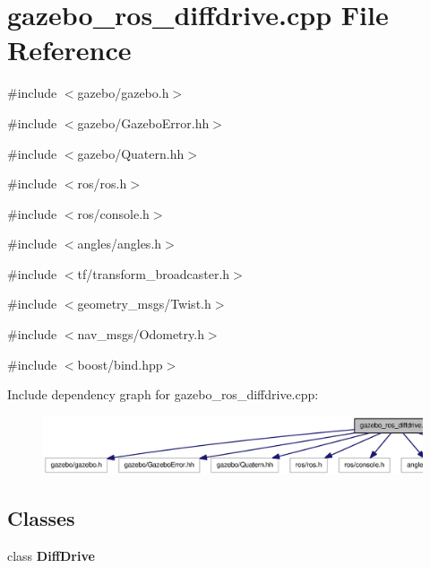 \section{gazebo\_\-ros\_\-diffdrive.cpp File Reference}
\label{gazebo__ros__diffdrive_8cpp}
{\ttfamily \#include $<$gazebo/gazebo.h$>$}\par
{\ttfamily \#include $<$gazebo/GazeboError.hh$>$}\par
{\ttfamily \#include $<$gazebo/Quatern.hh$>$}\par
{\ttfamily \#include $<$ros/ros.h$>$}\par
{\ttfamily \#include $<$ros/console.h$>$}\par
{\ttfamily \#include $<$angles/angles.h$>$}\par
{\ttfamily \#include $<$tf/transform\_\-broadcaster.h$>$}\par
{\ttfamily \#include $<$geometry\_\-msgs/Twist.h$>$}\par
{\ttfamily \#include $<$nav\_\-msgs/Odometry.h$>$}\par
{\ttfamily \#include $<$boost/bind.hpp$>$}\par
Include dependency graph for gazebo\_\-ros\_\-diffdrive.cpp:
\nopagebreak
\begin{figure}[H]
\begin{center}
\leavevmode
\includegraphics[width=400pt]{gazebo__ros__diffdrive_8cpp__incl}
\end{center}
\end{figure}
\subsection*{Classes}
\begin{DoxyCompactItemize}
\item 
class {\bf DiffDrive}
\end{DoxyCompactItemize}
